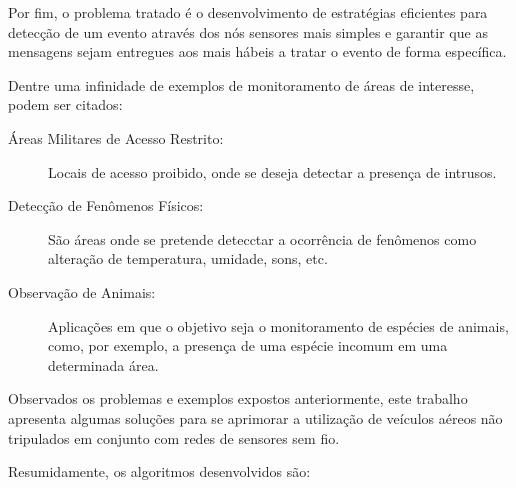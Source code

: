 Por fim, o problema tratado é o desenvolvimento de estratégias eficientes para detecção de um evento através dos
nós sensores mais simples e garantir que as mensagens sejam entregues aos \vants
mais hábeis a tratar o evento de forma específica.

Dentre uma infinidade de exemplos de monitoramento de áreas de interesse,
podem ser citados:

\begin{description}
 \item [Áreas Militares de Acesso Restrito:] Locais de acesso proibido, onde se deseja detectar a presença de intrusos.
 \item [Detecção de Fenômenos Físicos:] São áreas onde se pretende detecctar a ocorrência de fenômenos como alteração de
temperatura, umidade, sons, etc.
 \item [Observação de Animais:] Aplicações em que o objetivo seja o monitoramento de espécies de animais, como, por exemplo,
a presença de uma espécie incomum em uma determinada área.
\end{description}



Observados os problemas e exemplos expostos anteriormente, este trabalho apresenta algumas soluções para se aprimorar
a utilização de veículos aéreos não tripulados em conjunto com redes de sensores sem fio.

Resumidamente, os algoritmos desenvolvidos são:

